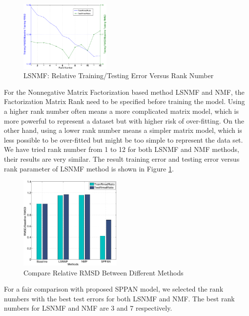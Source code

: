 \documentclass[conference,compsoc]{IEEEtran}
\begin{document}
\begin{figure}[!ht]
  \centering
  \includegraphics[width=0.4\textwidth]{figures/learning_curve_lsnmf_subsample_relative.eps}
  \caption{LSNMF: Relative Training/Testing Error Versus Rank Number}
  \label{fig:lsnmf_learning}
\end{figure}

For the Nonnegative Matrix Factorization based method LSNMF and NMF, the Factorization Matrix Rank need to be specified before training the model. Using a higher rank number often means a more complicated matrix model, which is more powerful to represent a dataset but with higher risk of over-fitting. On the other hand, using a lower rank number means a simpler matrix model, which is less possible to be over-fitted but might be too simple to represent the data set. We have tried rank number from 1 to 12 for both LSNMF and NMF methods, their results are very similar. The result training error and testing error versus rank parameter of LSNMF method is shown in Figure \ref{fig:lsnmf_learning}.

\begin{figure}[!ht]
  \centering
  \includegraphics[width=0.45\textwidth]{figures/methos_comparison_all_relative.eps}
  \caption{Compare Relative RMSD Between Different Methods}
  \label{fig:rmsd_compare}
\end{figure}

For a fair comparison with proposed SPPAN model, we selected the rank numbers with the best test errors for both LSNMF and NMF. The best rank numbers for LSNMF and NMF are 3 and 7 respectively.
\end{document}
